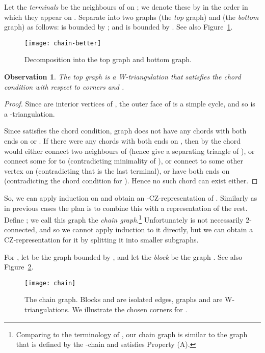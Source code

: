 \documentclass{article}
\renewcommand{\int}[1]{}
\newtheorem{observation}[theorem]{Observation}
\begin{document}
Let the {\em terminals} be the neighbours of 
on ; we denote these by  in the order in which
they appear on . 
Separate  into two graphs  (the \emph{top} graph) and  (the \emph{bottom} graph) as follows:  is bounded 
by ;
and  is bounded by . See also Figure~\ref{fig:top-bottom}.


\begin{figure}
	\centering
	\texttt{[image: chain-better]}
	\caption{Decomposition into the top graph and bottom graph.}
        \label{fig:top-bottom}
\end{figure}

\begin{observation}
        The top graph  is a W-triangulation that satisfies the chord condition with respect to corners
	 and . 
\end{observation}
\begin{proof}
Since  are interior vertices of , the outer face of 
is a simple cycle, and so  is a -triangulation.

    Since  satisfies the chord condition, graph  does not have any 
chords with both ends on  or .
If there were any chords with both ends on , then by 
the chord would either
connect two neighbours of  (hence give a separating triangle of ),
or connect some  for  to  (contradicting minimality of ),
or connect  to some other vertex on  (contradicting that
 is the last terminal), or have both ends on  (contradicting the chord condition
for ).    Hence no such chord can exist either.
\end{proof}

So, we can apply induction on  and obtain an
\int{(u_1,u_2)}-CZ-rep\-re\-sen\-ta\-tion of .  Similarly as in previous cases
the plan is to combine this with a representation of the rest.
Define ; we call this graph the {\em chain graph}.\footnote{Comparing to the terminology of \cite{cit:ham-cycle}, our chain
graph is similar to the graph  that is defined by the -chain and
satisfies Property (A).}
Unfortunately  is not
necessarily 2-connected, and so we cannot apply induction to it directly,
but we can obtain a CZ-representation for it by splitting it into smaller subgraphs.

For , let  be the graph bounded by , 
and let the {\em  block}
be the graph .  See also Figure~\ref{fig:chain_blocks}.

\begin{figure}
	\centering
	\texttt{[image: chain]}
	\caption{The chain graph. Blocks  and  are isolated
	edges, graphs  and  are W-triangulations.  We illustrate
	the chosen corners for .}
	\label{fig:chain_blocks}
\end{figure}
\end{document}
